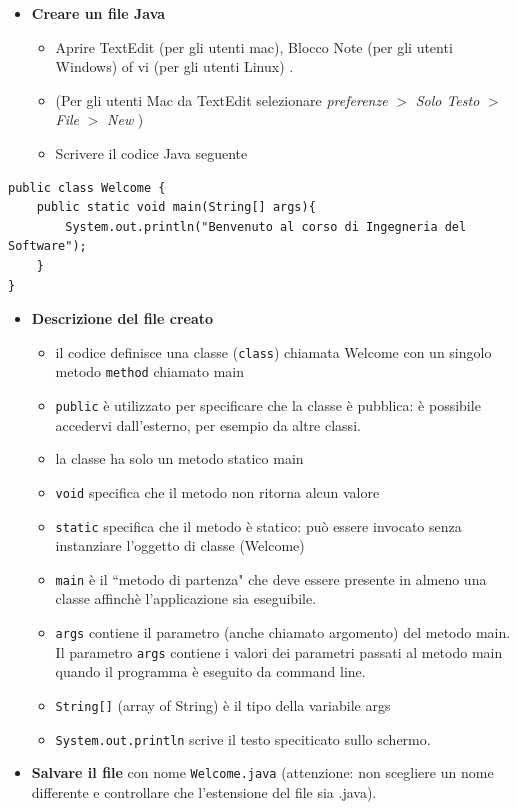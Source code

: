 \documentclass{article}
\theoremstyle{definition}
\begin{document}
\begin{itemize}
\item \textbf{Creare un file Java}
\begin{itemize}
\item Aprire  TextEdit (per gli utenti mac), Blocco Note (per gli utenti Windows) of vi (per gli utenti Linux) .
\item (Per gli utenti Mac da TextEdit selezionare \textit{preferenze} $>$ \textit{Solo Testo} $>$ \textit{File} $>$ \textit{New} )
\item Scrivere il codice  Java seguente
\end{itemize}
\end{itemize}
\begin{lstlisting}
public class Welcome {	
    public static void main(String[] args){	
	 	System.out.println("Benvenuto al corso di Ingegneria del Software");
    }
}
\end{lstlisting}
\begin{itemize}
\item \textbf{Descrizione del file creato}
\begin{itemize}
\item il codice definisce una classe (\texttt{class}) chiamata  Welcome con un singolo metodo  \texttt{method} chiamato main
\item \texttt{public} \`e utilizzato per specificare che la classe \`e pubblica: \`e possibile accedervi dall'esterno, per esempio da altre classi.
\item la classe ha solo un metodo statico main
\item \texttt{void} specifica che il metodo non ritorna alcun valore
\item \texttt{static} specifica che il metodo \`e statico: pu\`o essere invocato senza instanziare l'oggetto di classe  (Welcome)
\item \texttt{main} \`e il ``metodo di partenza" che deve essere presente in almeno una classe affinch\`e l'applicazione sia eseguibile. 
\item \texttt{args} contiene il parametro (anche chiamato argomento) del metodo main. Il parametro \texttt{args} contiene i valori dei parametri passati al metodo main quando il programma \`e eseguito da command line.
\item \texttt{String[]} (array of String) \`e il tipo della variabile args 
\item \texttt{System.out.println} scrive il testo speciticato sullo schermo.
\end{itemize}
\end{itemize}
\begin{itemize}
\item \textbf{Salvare il file} con nome \texttt{Welcome.java} (attenzione: non scegliere un nome differente e controllare che l'estensione del file sia .java).
\end{itemize}
\end{document}
